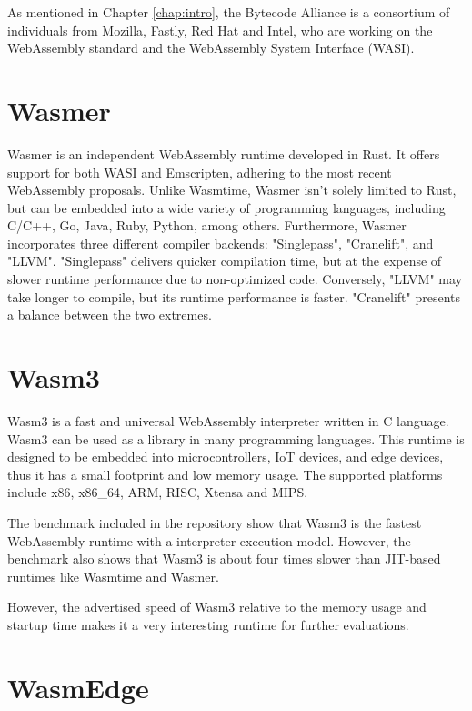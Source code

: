 As mentioned in Chapter \ref{chap:intro}, the Bytecode Alliance is a consortium of individuals from Mozilla, Fastly, Red Hat and Intel, who are working on the WebAssembly standard and the \hbox{WebAssembly} System Interface (WASI).

\section{Wasmer}
\label{sec:wasmer}

Wasmer \cite{wasmerinc_2023_wasmer} is an independent WebAssembly runtime developed in Rust. It offers support for both WASI and Emscripten, adhering to the most recent WebAssembly proposals. Unlike Wasmtime, Wasmer isn't solely limited to Rust, but can be embedded into a wide variety of programming languages, including C/C++, Go, Java, Ruby, Python, among others. Furthermore, Wasmer incorporates three different compiler backends: "Singlepass", "Cranelift", and "\gls{LLVM}". "Singlepass" delivers quicker compilation time, but at the expense of slower runtime performance due to non-optimized code. Conversely, "LLVM" may take longer to compile, but its runtime performance is faster. "Cranelift" presents a balance between the two extremes.

\section{Wasm3}
\label{sec:wasm3}

Wasm3 \cite{shymanskyy_2023_wasm3} is a fast and universal WebAssembly interpreter written in C language. Wasm3 can be used as a library in many programming languages. This runtime is designed to be embedded into microcontrollers, IoT devices, and edge devices, thus it has a small footprint and low memory usage. The supported platforms include x86, x86\_64, ARM, RISC, Xtensa and MIPS.

The benchmark included in the repository \cite{shymanskyy_2023_wasm3} show that Wasm3 is the fastest \gls{WebAssembly} runtime with a interpreter execution model. However, the benchmark also shows that Wasm3 is about four times slower than JIT-based runtimes like Wasmtime and Wasmer. 

However, the advertised speed of Wasm3 relative to the memory usage and startup time makes it a very interesting runtime for further evaluations.

\section{WasmEdge}
\label{sec:wasmedge}

